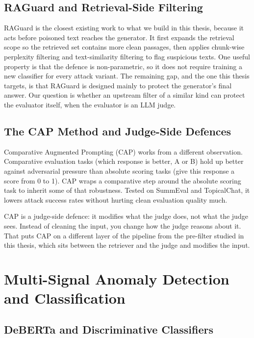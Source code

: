 \subsection{RAGuard and Retrieval-Side Filtering}

RAGuard \citep{cheng2025raguard} is the closest existing work to what we build in this thesis, because it acts before poisoned text reaches the generator. It first expands the retrieval scope so the retrieved set contains more clean passages, then applies chunk-wise perplexity filtering and text-similarity filtering to flag suspicious texts. One useful property is that the defence is non-parametric, so it does not require training a new classifier for every attack variant. The remaining gap, and the one this thesis targets, is that RAGuard is designed mainly to protect the generator's final answer. Our question is whether an upstream filter of a similar kind can protect the evaluator itself, when the evaluator is an LLM judge.

\subsection{The CAP Method and Judge-Side Defences}

Comparative Augmented Prompting (CAP) works from a different observation. Comparative evaluation tasks (which response is better, A or B) hold up better against adversarial pressure than absolute scoring tasks (give this response a score from 0 to 1). CAP wraps a comparative step around the absolute scoring task to inherit some of that robustness. Tested on SummEval and TopicalChat, it lowers attack success rates without hurting clean evaluation quality much.

CAP is a judge-side defence: it modifies what the judge does, not what the judge sees. Instead of cleaning the input, you change how the judge reasons about it. That puts CAP on a different layer of the pipeline from the pre-filter studied in this thesis, which sits between the retriever and the judge and modifies the input.

\section{Multi-Signal Anomaly Detection and Classification}

\subsection{DeBERTa and Discriminative Classifiers}

